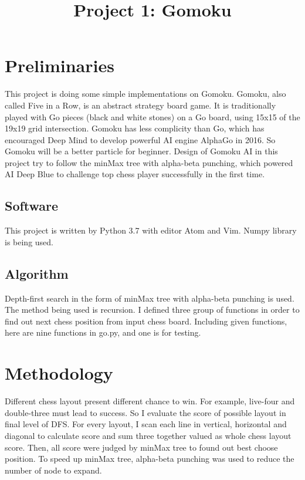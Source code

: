 \documentclass[conference,compsoc]{IEEEtran}
\begin{document}
\title{Project 1: Gomoku}

\author{
}

\maketitle


\IEEEpeerreviewmaketitle

\section{Preliminaries}
This project is doing some simple implementations on Gomoku. Gomoku, also called 
Five in a Row, is an abstract strategy board game. It is traditionally played 
with Go pieces (black and white stones) on a Go board, using 15x15 of the 19x19
grid intersection.\cite{1} Gomoku has less complicity than Go, which has encouraged
Deep Mind to develop powerful AI engine AlphaGo in 2016. So Gomoku will be a
better particle for beginner. Design of Gomoku AI in this project try to
follow the minMax tree with alpha-beta punching, which powered AI Deep Blue to
challenge top chess player successfully in the first time.

\subsection{Software}
This project is written by Python 3.7 with editor Atom and Vim. Numpy library
is being used.


\subsection{Algorithm}
Depth-first search in the form of minMax tree with alpha-beta punching is used.
The method being used is recursion. I defined three group of functions in order
to find out next chess position from input chess board. Including given
functions, here are nine functions in go.py, and one is for testing.


\section{Methodology}
Different chess layout present different chance to win. For example, live-four
and double-three must lead to success. So I evaluate the score of possible
layout in final level of DFS. For every layout, I scan each line in vertical,
horizontal and diagonal to calculate score and sum three together valued as
whole chess layout score. Then, all score were judged by minMax tree to found
out best choose position. To speed up minMax tree, alpha-beta punching was used
to reduce the number of node to expand.
\end{document}

